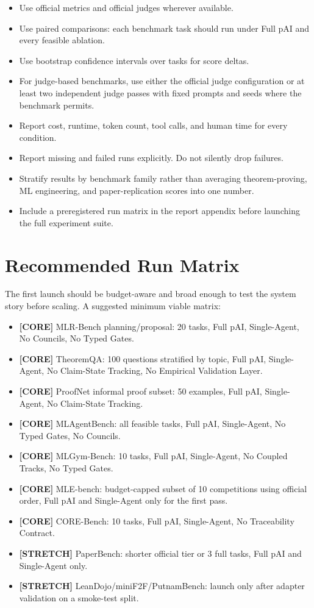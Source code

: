 \documentclass[11pt]{article}
\newcommand{\core}{\textbf{\textcolor{green!45!black}{[CORE]}}}
\newcommand{\tagstretch}{\textbf{\textcolor{blue!65!black}{[STRETCH]}}}
\newcommand{\pai}{pAI}
\begin{document}
\begin{itemize}
  \item Use official metrics and official judges wherever available.
  \item Use paired comparisons: each benchmark task should run under Full \pai{} and every feasible ablation.
  \item Use bootstrap confidence intervals over tasks for score deltas.
  \item For judge-based benchmarks, use either the official judge configuration or at least two independent judge passes with fixed prompts and seeds where the benchmark permits.
  \item Report cost, runtime, token count, tool calls, and human time for every condition.
  \item Report missing and failed runs explicitly. Do not silently drop failures.
  \item Stratify results by benchmark family rather than averaging theorem-proving, ML engineering, and paper-replication scores into one number.
  \item Include a preregistered run matrix in the report appendix before launching the full experiment suite.
\end{itemize}

\section*{Recommended Run Matrix}

The first launch should be budget-aware and broad enough to test the system story before scaling. A suggested minimum viable matrix:

\begin{itemize}
  \item \core{} MLR-Bench planning/proposal: 20 tasks, Full \pai{}, Single-Agent, No Councils, No Typed Gates.
  \item \core{} TheoremQA: 100 questions stratified by topic, Full \pai{}, Single-Agent, No Claim-State Tracking, No Empirical Validation Layer.
  \item \core{} ProofNet informal proof subset: 50 examples, Full \pai{}, Single-Agent, No Claim-State Tracking.
  \item \core{} MLAgentBench: all feasible tasks, Full \pai{}, Single-Agent, No Typed Gates, No Councils.
  \item \core{} MLGym-Bench: 10 tasks, Full \pai{}, Single-Agent, No Coupled Tracks, No Typed Gates.
  \item \core{} MLE-bench: budget-capped subset of 10 competitions using official order, Full \pai{} and Single-Agent only for the first pass.
  \item \core{} CORE-Bench: 10 tasks, Full \pai{}, Single-Agent, No Traceability Contract.
  \item \tagstretch{} PaperBench: shorter official tier or 3 full tasks, Full \pai{} and Single-Agent only.
  \item \tagstretch{} LeanDojo/miniF2F/PutnamBench: launch only after adapter validation on a smoke-test split.
\end{itemize}
\end{document}
